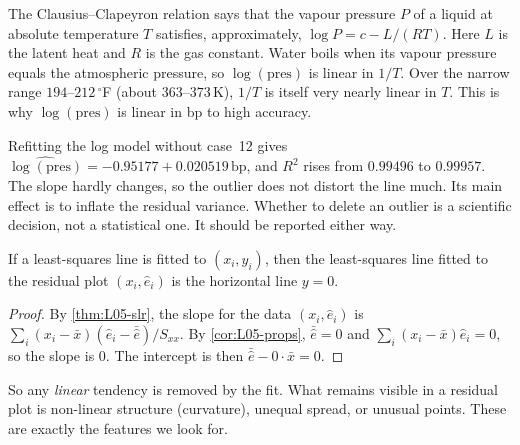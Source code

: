 \begin{note}
The Clausius--Clapeyron relation says that the vapour pressure $P$ of a liquid at absolute
temperature $T$ satisfies, approximately, $\log P = c - L/(RT)$. Here $L$ is the latent heat
and $R$ is the gas constant. Water boils when its vapour pressure equals the atmospheric
pressure, so $\log(\text{pres})$ is linear in $1/T$. Over the narrow range
$194$--$212\,^\circ$F (about $363$--$373$\,K), $1/T$ is itself very nearly linear in $T$. This is
why $\log(\text{pres})$ is linear in bp to high accuracy.
\end{note}

\begin{note}
Refitting the log model without case~12 gives $\widehat{\log(\text{pres})}=-0.95177+0.020519\,\text{bp}$,
and $R^2$ rises from $0.99496$ to $0.99957$. The slope hardly changes, so the outlier does not
distort the line much. Its main effect is to inflate the residual variance. Whether to delete an
outlier is a scientific decision, not a statistical one. It should be reported either way.
\end{note}

\begin{proposition}\label{prop:L06-noline}
If a least-squares line is fitted to $(x_i,y_i)$, then the least-squares line fitted to the
residual plot $(x_i,\hat e_i)$ is the horizontal line $y=0$.
\end{proposition}
\begin{proof}
By \cref{thm:L05-slr}, the slope for the data $(x_i,\hat e_i)$ is
$\sum_i (x_i-\bar x)(\hat e_i-\bar{\hat e})/S_{xx}$. By \cref{cor:L05-props},
$\bar{\hat e}=0$ and $\sum_i (x_i-\bar x)\hat e_i=0$, so the slope is $0$. The intercept is then
$\bar{\hat e}-0\cdot\bar x=0$.
\end{proof}
So any \emph{linear} tendency is removed by the fit. What remains visible in a residual plot is
non-linear structure (curvature), unequal spread, or unusual points. These are exactly the
features we look for.

